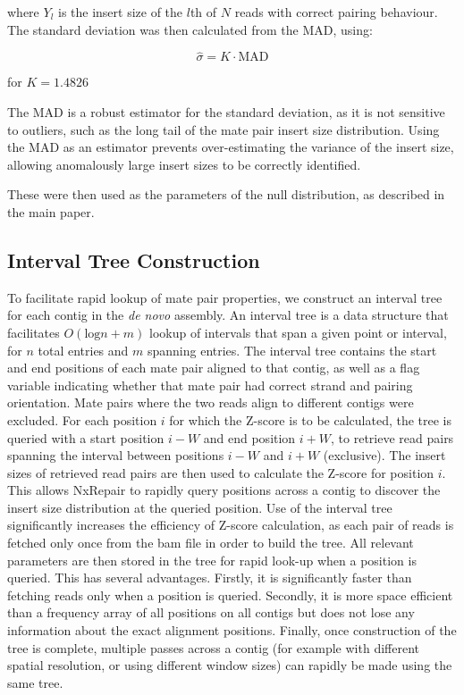 \documentclass[fleqn,10pt]{wlpeerj}
\begin{document}
where $Y_l$ is the insert size of the $l$th of $N$ reads with correct pairing behaviour. The standard deviation was then calculated from the MAD, using:

\begin{equation}
\hat{\sigma} = K \cdot \text{MAD}
\label{eq:mad_to_sigma}
\end{equation}

for $K = 1.4826$

The $\text{MAD}$ is a robust estimator for the standard deviation, as it is not sensitive to outliers, such as the long tail of the mate pair insert size distribution. Using the MAD as an estimator prevents over-estimating the variance of the insert size, allowing anomalously large insert sizes to be correctly identified.

These were then used as the parameters of the null distribution, as described in the main paper.

\subsection*{Interval Tree Construction}
To facilitate rapid lookup of mate pair properties, we construct an interval tree~\citep{cormen2009} for each contig in the \textit{de novo} assembly. An interval tree is a data structure that facilitates $O(\text{log} n + m)$ lookup of intervals that span a given point or interval, for $n$ total entries and $m$ spanning entries. The interval tree contains the start and end positions of each mate pair aligned to that contig, as well as a flag variable indicating whether that mate pair had correct strand and pairing orientation. Mate pairs where the two reads align to different contigs were excluded. For each position $i$ for which the Z-score is to be calculated, the tree is queried with a start position $i-W$ and end position $i+W$, to retrieve read pairs spanning the interval between positions $i-W$ and $i+W$ (exclusive). The insert sizes of retrieved read pairs are then used to calculate the Z-score for position $i$. This allows NxRepair to rapidly query positions across a contig to discover the insert size distribution at the queried position. Use of the interval tree significantly increases the efficiency of Z-score calculation, as each pair of reads is fetched only once from the bam file in order to build the tree. All relevant parameters are then stored in the tree for rapid look-up when a position is queried. This has several advantages. Firstly, it is significantly faster than fetching reads only when a position is queried. Secondly, it is more space efficient than a frequency array of all positions on all contigs but does not lose any information about the exact alignment positions. Finally, once construction of the tree is complete, multiple passes across a contig (for example with different spatial resolution, or using different window sizes) can rapidly be made using the same tree.      
\end{document}
